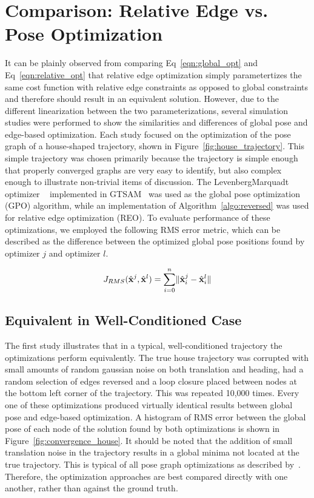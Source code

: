 
\section{Comparison: Relative Edge vs. Pose Optimization}

It can be plainly observed from comparing Eq~\ref{eqn:global_opt} and Eq~\ref{eqn:relative_opt} that relative edge optimization simply parametertizes the same cost function with relative edge constraints as opposed to global constraints and therefore should result in an equivalent solution.  However, due to the different linearization between the two parameterizations, several simulation studies were performed to show the similarities and differences of global pose and edge-based optimization. Each study focused on the optimization of the pose graph of a house-shaped trajectory, shown in Figure~\ref{fig:house_trajectory}.  This simple trajectory was chosen primarily because the trajectory is simple enough that properly converged graphs are very easy to identify, but also complex enough to illustrate non-trivial items of discussion.  The LevenbergMarquadt optimizer ~\cite{LM Optimization} implemented in GTSAM~\cite{Dellaert2012 - GTSAM} was used as the global pose optimization (GPO) algorithm, while an implementation of Algorithm~\ref{algo:reversed} was used for relative edge optimization (REO).  To evaluate performance of these optimizations, we employed the following RMS error metric, which can be described as the difference between the optimized global pose positions found by optimizer $j$ and optimizer $l$.

\begin{align}
    J_{RMS}(\hat{\mathbf{x}}^j, \hat{\mathbf{x}}^l) = \sum_{i=0}^n \lVert \hat{\mathbf{x}}^j_i - \hat{\mathbf{x}}^l_i \rVert
    \label{eq:RMS_error}
\end{align}

\subsection{Equivalent in Well-Conditioned Case}

The first study illustrates that in a typical, well-conditioned trajectory the optimizations perform equivalently.  The true house trajectory was corrupted with small amounts of random gaussian noise on both translation and heading, had a random selection of edges reversed and a loop closure placed between nodes at the bottom left corner of the trajectory. This was repeated 10,000 times.  Every one of these optimizations produced virtually identical results between global pose and edge-based optimization.  A histogram of RMS error between the global pose of each node of the solution found by both optimizations is shown in Figure~\ref{fig:convergence_house}.  It should be noted that the addition of small translation noise in the trajectory results in a global minima not located at the true trajectory.  This is typical of all pose graph optimizations as described by~\cite{POSE_GRAPH_ERROR}.  Therefore, the optimization approaches are best compared directly with one another, rather than against the ground truth.

